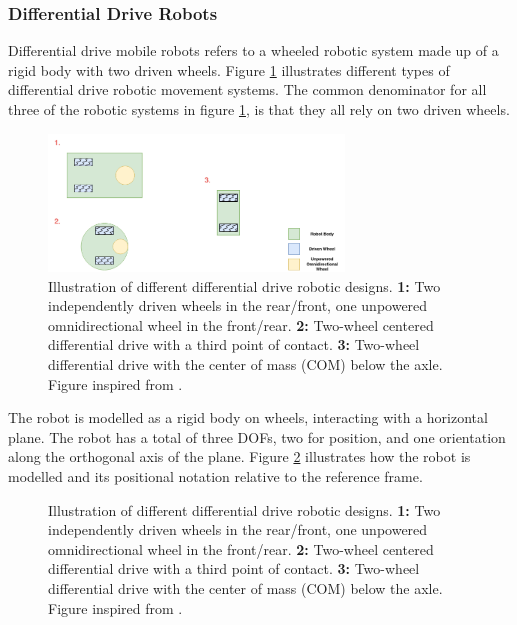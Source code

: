 \subsubsection{Differential Drive Robots}
Differential drive mobile robots refers to a wheeled robotic system made up of a rigid body with two driven wheels. Figure \ref{fig:differentialDrive} illustrates different types of differential drive robotic movement systems. The common denominator for all three of the robotic systems in figure \ref{fig:differentialDrive}, is that they all rely on two driven wheels.

\begin{figure}[H]
  \centering
  \includegraphics[width = 0.7\textwidth]{Figures/DifferentialDrive.drawio.png}
  \caption{Illustration of different differential drive robotic designs. \textbf{1:} Two independently driven wheels in the rear/front, one unpowered omnidirectional wheel in the front/rear. \textbf{2:} Two-wheel centered differential drive with a third point of contact. \textbf{3:} Two-wheel differential drive with the center of mass (COM) below the axle. Figure inspired from \cite{SiegwartRoland2011Itam}.}
  \label{fig:differentialDrive}
\end{figure}

The robot is modelled as a rigid body on wheels, interacting with a horizontal plane. The robot has a total of three DOFs, two for position, and one orientation along the orthogonal axis of the plane. Figure \ref{fig:PositionalRepresentation} illustrates how the robot is modelled and its  positional notation relative to the reference frame.

\begin{figure}[H]
  \centering
  
  \caption{Illustration of different differential drive robotic designs. \textbf{1:} Two independently driven wheels in the rear/front, one unpowered omnidirectional wheel in the front/rear. \textbf{2:} Two-wheel centered differential drive with a third point of contact. \textbf{3:} Two-wheel differential drive with the center of mass (COM) below the axle. Figure inspired from \cite{SiegwartRoland2011Itam}.}
  \label{fig:PositionalRepresentation}
\end{figure}



